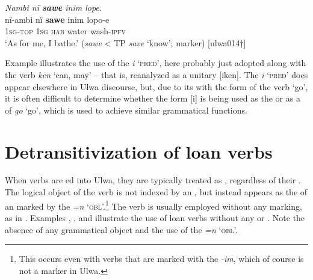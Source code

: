 \ea%
    \label{ex:loss:17}
          \textit{Nambi nï \textbf{sawe} inim lope.}\\
\gll    nï-ambi  nï    \textbf{sawe}  inim  lopo-e\\
    1\textsc{sg-top}  \textsc{1sg}  \textsc{hab}  water  wash-\textsc{ipfv}\\
\glt `As for me, I bathe.’ (\textit{sawe} < TP \textit{save} ‘know’;  marker) [ulwa014†]
\z

Example  illustrates the use of the   \textit{i} ‘\textsc{pred’}, here probably just adopted along with the verb \textit{ken} ‘can, may’ -- that is, reanalyzed as a unitary  [iken]. The  \textit{i} ‘\textsc{pred’} does appear elsewhere in Ulwa discourse, but, due to its  with the   form of the verb ‘go’, it is often difficult to determine whether the form [i] is being used as the  or as a  of  \textit{go} ‘go’, which is used to achieve similar grammatical functions.



\section{Detransitivization of loan verbs}\label{sec:15.6}


When  verbs are ed into Ulwa, they are typically treated as , regardless of their . The logical object of the verb is not indexed by an , but instead appears as the  of an   marked by the  \textit{=n} ‘\textsc{obl}’.\footnote{This occurs even with  verbs that are marked with the   \textit{-im}, which of course is not a  marker in Ulwa.} The  verb is usually employed without any  marking, as in . Examples , , and  illustrate the use of  loan verbs without any  or . Note the absence of any grammatical object and the use of the  \textit{=n} `\textsc{obl}’.

